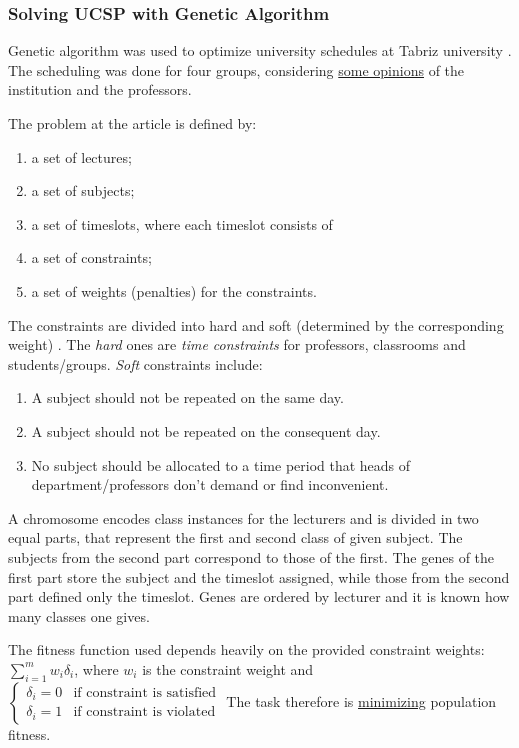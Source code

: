 \documentclass[../header]{subfiles}
\begin{document}
\providecommand{\rootdir}{..}



\subsubsection{Solving UCSP with Genetic Algorithm}
Genetic algorithm was used to optimize university schedules at Tabriz university
\cite{UCSP-GA}. The scheduling was done for four groups, considering
\underline{some opinions} of the institution and the professors.

The problem at the article is defined by:
\begin{enumerate}
  \item a set of lectures;
  \item a set of subjects;
  \item a set of timeslots, where each timeslot consists of
  \item a set of constraints;
  \item a set of weights (penalties) for the constraints.
\end{enumerate}

The constraints are divided into hard and soft (determined by the corresponding
weight) \cite{UCSP-GA}.
The \emph{hard} ones are \emph{time constraints} for professors, classrooms and
students/groups.
\emph{Soft} constraints include:
\begin{enumerate}
  \item A subject should not be repeated on the same day.
  \item A subject should not be repeated on the consequent day.
  \item No subject should be allocated to a time period that
        heads of department/professors don't demand or find inconvenient.
\end{enumerate}



\bigskip\noindent
A chromosome encodes class instances for the lecturers and is divided in two equal
parts, that represent the first and second class of given subject.
The subjects from the second part correspond to those of the first.
The genes of the first part store the subject and the timeslot assigned, while
those from the second part defined only the timeslot. Genes are ordered by
lecturer and it is known how many classes one gives.

The fitness function used depends heavily on the provided constraint weights:
$\sum\limits_{i=1}^m w_i \delta_i$, where $w_i$ is the constraint weight and
$\begin{cases}
  \delta_i = 0 & \text{if constraint is satisfied}\\
  \delta_i = 1 & \text{if constraint is violated}
\end{cases}$
The task therefore is \underline{minimizing} population fitness.
\end{document}
